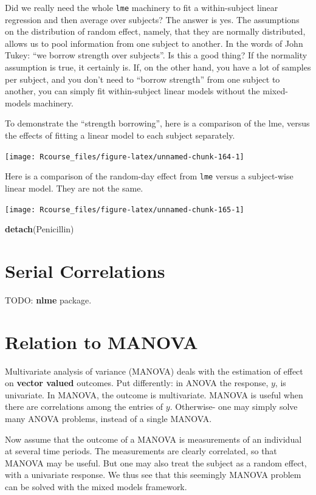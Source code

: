 \documentclass[]{book}
\newenvironment{Shaded}{\begin{snugshade}}{\end{snugshade}}
\newcommand{\KeywordTok}[1]{\textcolor[rgb]{0.13,0.29,0.53}{\textbf{#1}}}
\newcommand{\NormalTok}[1]{#1}
\theoremstyle{definition}
\theoremstyle{definition}
\theoremstyle{definition}
\theoremstyle{remark}
\begin{document}
Did we really need the whole \texttt{lme} machinery to fit a
within-subject linear regression and then average over subjects? The
answer is yes. The assumptions on the distribution of random effect,
namely, that they are normally distributed, allows us to pool
information from one subject to another. In the words of John Tukey:
``we borrow strength over subjects''. Is this a good thing? If the
normality assumption is true, it certainly is. If, on the other hand,
you have a lot of samples per subject, and you don't need to ``borrow
strength'' from one subject to another, you can simply fit
within-subject linear models without the mixed-models machinery.

To demonstrate the ``strength borrowing'', here is a comparison of the
lme, versus the effects of fitting a linear model to each subject
separately.

\texttt{[image: Rcourse\_files/figure-latex/unnamed-chunk-164-1]}

Here is a comparison of the random-day effect from \texttt{lme} versus a
subject-wise linear model. They are not the same.

\texttt{[image: Rcourse\_files/figure-latex/unnamed-chunk-165-1]}

\begin{Shaded}
\begin{Highlighting}[]
\KeywordTok{detach}\NormalTok{(Penicillin)}
\end{Highlighting}
\end{Shaded}

\section{Serial Correlations}\label{serial-correlations}

TODO: \textbf{nlme} package.

\section{Relation to MANOVA}\label{manova}

Multivariate analysis of variance (MANOVA) deals with the estimation of
effect on \textbf{vector valued} outcomes. Put differently: in ANOVA the
response, \(y\), is univariate. In MANOVA, the outcome is multivariate.
MANOVA is useful when there are correlations among the entries of \(y\).
Otherwise- one may simply solve many ANOVA problems, instead of a single
MANOVA.

Now assume that the outcome of a MANOVA is measurements of an individual
at several time periods. The measurements are clearly correlated, so
that MANOVA may be useful. But one may also treat the subject as a
random effect, with a univariate response. We thus see that this
seemingly MANOVA problem can be solved with the mixed models framework.
\end{document}
